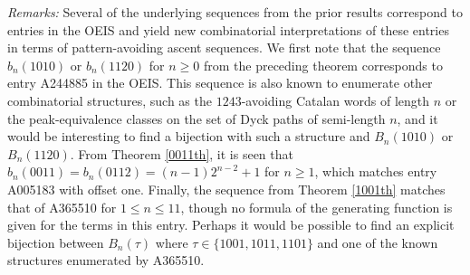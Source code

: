 \documentclass{article}
\theoremstyle{remark}
\theoremstyle{plain}
\begin{document}
\noindent\emph{Remarks:} Several of the underlying sequences from the prior results correspond to entries in the OEIS \cite{Sloane} and yield new combinatorial interpretations of these entries in terms of pattern-avoiding ascent sequences.   We first note that the sequence $b_n(1010)$ or $b_n(1120)$ for $n \geq0$ from the preceding theorem corresponds to entry A244885 in the OEIS.  This sequence is also known to enumerate other combinatorial structures, such as the $1243$-avoiding Catalan words of length $n$ or the peak-equivalence classes on the set of Dyck paths of semi-length $n$, and it would be interesting to find a bijection with such a structure and $B_n(1010)$ or $B_n(1120)$.  From Theorem \ref{0011th}, it is seen that $b_n(0011)=b_n(0112)=(n-1)2^{n-2}+1$ for $n \geq 1$, which matches entry A005183 with offset one.  Finally, the sequence from Theorem \ref{1001th} matches that of A365510 for $1 \leq n \leq 11$, though no formula of the generating function is given for the terms in this entry.  Perhaps it would be possible to find an explicit bijection between $B_n(\tau)$ where $\tau \in \{1001,1011,1101\}$ and one of the known structures enumerated by A365510. \medskip
\end{document}
